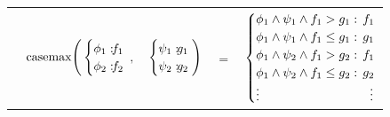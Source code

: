 \documentclass{article} %
\newcommand{\casemax}{\mathrm{casemax}}
\begin{document}
{\footnotesize
\vspace{-2mm}
\begin{center}
\begin{tabular}{r c c c l}
&
\hspace{-7mm} $\casemax \Bigg(
  \begin{cases}
    \phi_1: \hspace{-2mm} & \hspace{-2mm} f_1 \\ 
    \phi_2: \hspace{-2mm} & \hspace{-2mm} f_2 \\ 
  \end{cases}$
$,$
&
\hspace{-4mm}
  $\begin{cases}
    \psi_1: \hspace{-2mm} & \hspace{-2mm} g_1 \\ 
    \psi_2: \hspace{-2mm} & \hspace{-2mm} g_2 \\ 
  \end{cases} \Bigg)$
&
\hspace{-4mm} 
$ = $
&
\hspace{-4mm}
  $\begin{cases}
  \phi_1 \wedge \psi_1 \wedge f_1 > g_1    : & \hspace{-2mm} f_1 \\ 
  \phi_1 \wedge \psi_1 \wedge f_1 \leq g_1 : & \hspace{-2mm} g_1 \\ 
  \phi_1 \wedge \psi_2 \wedge f_1 > g_2    : & \hspace{-2mm}f_1 \\ 
  \phi_1 \wedge \psi_2 \wedge f_1 \leq g_2 : & \hspace{-2mm} g_2 \\ 
  \vdots & \vdots
  \end{cases}$
\end{tabular}
\end{center}
\vspace{-3mm}
}
\end{document}
